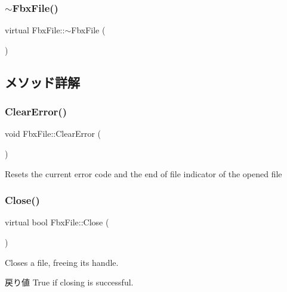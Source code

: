 \mbox{\label{class_fbx_file_a2dd86a0057e7caa4865a92508cc9b56d}} 
\subsubsection{\texorpdfstring{$\sim$\+Fbx\+File()}{~FbxFile()}}
{\footnotesize\ttfamily virtual Fbx\+File\+::$\sim$\+Fbx\+File (\begin{DoxyParamCaption}{ }\end{DoxyParamCaption})\hspace{0.3cm}{\ttfamily [virtual]}}



\subsection{メソッド詳解}
\mbox{\label{class_fbx_file_abaf8e0ca1c1f47a349848ec49966cc6a}} 
\subsubsection{\texorpdfstring{Clear\+Error()}{ClearError()}}
{\footnotesize\ttfamily void Fbx\+File\+::\+Clear\+Error (\begin{DoxyParamCaption}{ }\end{DoxyParamCaption})}

Resets the current error code and the end of file indicator of the opened file \mbox{\label{class_fbx_file_ae8028a6bb80f3ebe4f6fcbaab367228b}} 
\subsubsection{\texorpdfstring{Close()}{Close()}}
{\footnotesize\ttfamily virtual bool Fbx\+File\+::\+Close (\begin{DoxyParamCaption}{ }\end{DoxyParamCaption})\hspace{0.3cm}{\ttfamily [virtual]}}

Closes a file, freeing its handle. \begin{DoxyReturn}{戻り値}
True if closing is successful. 
\end{DoxyReturn}
\mbox{\label{class_fbx_file_a3e438294b7e07dbc3b672ba771ebdd51}} 
